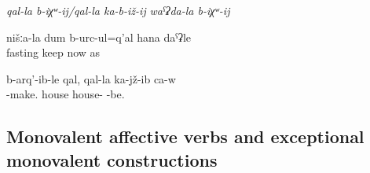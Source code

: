 \begin{exe}
	\ex	\label{ex:intransitiveverbsCompoundVerbs}
	\begin{xlist}
		\ex	{} 
		\ex	{} 
		\ex	{} 
		\ex \textit{qal-la b-iχʷ-ij\slash qal-la ka-b-iž-ij}  
		\ex \textit{waˁʡda-la b-iχʷ-ij} 
	\end{xlist}
	
		\ex	\label{ex:Our (people) were fasting like nowadays1}
	\gll	nišːa-la	dum	b-urc-ul=q'al	hana	daˁʡle\\
			fasting	keep	now	as\\
	\glt	{}
	
			\ex \label{ex:He built a house and married.}
		\gll b-arq'-ib-le qal, qal-la ka-jž-ib ca-w\\
		-make. house house- -be. \\
		\glt {}
		
	\end{exe}


\subsection{Monovalent affective verbs and exceptional monovalent constructions}
\label{sec:Monovalent affective verbs and exceptional monovalent constructions}

